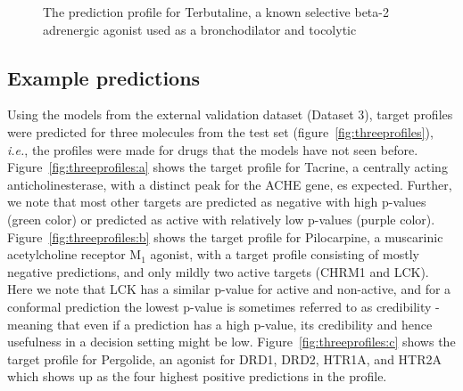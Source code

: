 \documentclass[utf8]{frontiersSCNS} %
\begin{document}
\begin{figure}
\begin{minipage}{0.25\textwidth}
        \label{fig:terbutaline:b}
    \end{minipage}
    \caption{The prediction profile for Terbutaline, a known selective beta-2
    adrenergic agonist  used as a broncho\-dilator and tocolytic
    \label{fig:web}}
\end{figure}

\subsection{Example predictions}
Using the models from the external validation dataset (Dataset 3), target
profiles were predicted for three molecules from the test set
(figure~\ref{fig:threeprofiles}), \textit{i.e.}, the profiles were made for
drugs that the models have not seen before. Figure~\ref{fig:threeprofiles:a}
shows the target profile for Tacrine, a centrally acting anticholinesterase,
with a distinct peak for the ACHE gene, es expected. Further, we note that most
other targets are predicted as negative with high p-values (green color) or
predicted as active with relatively low p-values (purple color).
Figure~\ref{fig:threeprofiles:b} shows the target profile for Pilocarpine, a
muscarinic acetylcholine receptor M$_1$ agonist, with a target profile
consisting of mostly negative predictions, and only mildly two active targets
(CHRM1 and LCK). Here we note that LCK has a similar p-value for active and
non-active, and for a conformal prediction the lowest p-value is sometimes
referred to as credibility - meaning that even if a prediction has a high
p-value, its credibility and hence usefulness in a decision setting might be
low. Figure~\ref{fig:threeprofiles:c} shows the target profile for Pergolide,
an agonist for DRD1, DRD2, HTR1A, and HTR2A which shows up as the four highest
positive predictions in the profile.
\end{document}
